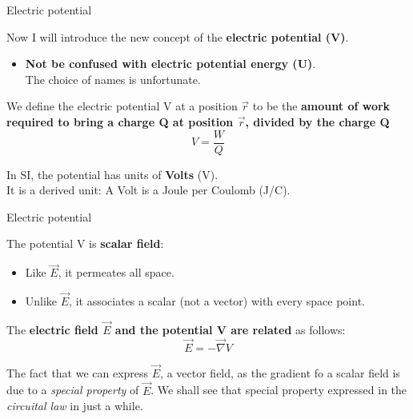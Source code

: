 %
%
%

\begin{frame}{Electric potential}

Now I will introduce the new concept of the {\bf electric potential (V)}.\\

\vspace{0.2cm}

\begin{itemize}
 \item {\bf Not be confused with electric potential energy (U)}. \\
       The choice of names is unfortunate.
\end{itemize}

\vspace{0.1cm}

We define the electric potential V at a position $\vec{r}$ to be the
{\bf amount of work required to bring a charge Q at position $\vec{r}$, divided by the charge Q}
\begin{equation*}
    V = \frac{W}{Q}
\end{equation*}

\vspace{0.1cm}

In SI, the potential has units of {\bf Volts} (V). \\
It is a derived unit: A Volt is a Joule per Coulomb (J/C).\\


\end{frame}

%
%
%

\begin{frame}{Electric potential}

The potential V is {\bf scalar field}:
\begin{itemize}
 \item
   Like $\vec{E}$, it permeates all space.
 \item
   Unlike $\vec{E}$, it associates a scalar (not a vector) with every space point.
\end{itemize}

\vspace{0.3cm}

The {\bf electric field $\vec{E}$ and the potential V are related} as follows:
\begin{equation*}
   \vec{E} = - \vec{\nabla} V
\end{equation*}

The fact that we can express $\vec{E}$, a vector field, as the gradient fo a scalar
field is due to a {\em special property} of $\vec{E}$.
We shall see that special property expressed in the {\em circuital law} in just a while.\\

\end{frame}

